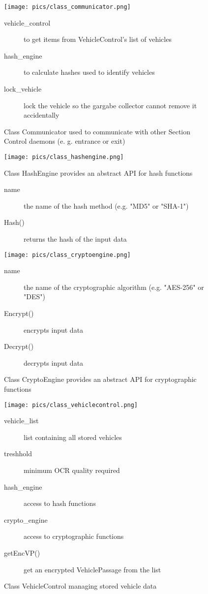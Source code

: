 \documentclass[oneside,bachelor,etd]{BYUPhys}
\begin{document}
\begin{figure}[p]
    \centerline{\texttt{[image: pics/class\_communicator.png]}}
    \caption[Class Communicator]{\label{fig:Class Communicator}
	Class Communicator used to communicate with other Section Control daemons (e. g. entrance or exit)}
	
	\begin{description}
	\item[vehicle\_control] to get items from VehicleControl's list of vehicles
	\item[hash\_engine] to calculate hashes used to identify vehicles
	\item[lock\_vehicle] lock the vehicle so the gargabe collector cannot remove it accidentally
	\end{description}
\end{figure}

\begin{figure}[p]
    \centerline{\texttt{[image: pics/class\_hashengine.png]}}
    \caption[Class HashEngine]{\label{fig:Class HashEngine}
	Class HashEngine provides an abstract API for hash functions}
	
	\begin{description}
	\item[name] the name of the hash method (e.g. "MD5" or "SHA-1")
	\item[Hash()] returns the hash of the input data
	\end{description}

    \centerline{\texttt{[image: pics/class\_cryptoengine.png]}}
    \caption[Class CryptoEngine]{\label{fig:Class CryptoEngine}
	Class CryptoEngine provides an abstract API for cryptographic functions}
	
	\begin{description}
	\item[name] the name of the cryptographic algorithm (e.g. "AES-256" or "DES")
	\item[Encrypt()] encrypts input data
	\item[Decrypt()] decrypts input data
	\end{description}
\end{figure}

\begin{figure}[p]
    \centerline{\texttt{[image: pics/class\_vehiclecontrol.png]}}
    \caption[Class VehicleControl]{\label{fig:Class VehicleControl}
	Class VehicleControl managing stored vehicle data}
	
	\begin{description}
	\item[vehicle\_list] list containing all stored vehicles
	\item[treshhold] minimum OCR quality required
	\item[hash\_engine] access to hash functions
	\item[crypto\_engine] access to cryptographic functions
	\item[getEncVP()] get an encrypted VehiclePassage from the list
	\end{description}
\end{figure}
\end{document}
